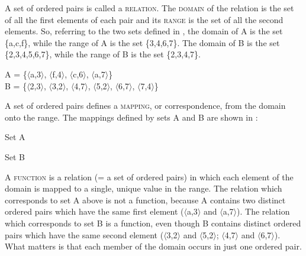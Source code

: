 A set of ordered pairs is called a \textsc{relation}. The \textsc{domain} of the relation is the set of all the first elements of each pair and its \textsc{range} is the set of all the second elements. So, referring to the two sets defined in , the domain of A is the set \{a,c,f\}, while the range of A is the set \{3,4,6,7\}. The domain of B is the set \{2,3,4,5,6,7\}, while the range of B is the set \{2,3,4,7\}. 


\ea
A = \{$\langle$a,3$\rangle$, $\langle$f,4$\rangle$, $\langle$c,6$\rangle$, $\langle$a,7$\rangle$\}\\
B = \{$\langle$2,3$\rangle$, $\langle$3,2$\rangle$, $\langle$4,7$\rangle$, $\langle$5,2$\rangle$, $\langle$6,7$\rangle$, $\langle$7,4$\rangle$\}
\z


A set of ordered pairs defines a \textsc{mapping}, or correspondence, from the domain onto the range. The mappings defined by sets A and B are shown in :

\ea
\ea  Set A\\
\ex  Set B\\

\z \z


A \textsc{function} is a relation (= a set of ordered pairs) in which each element of the domain is mapped to a single, unique value in the range. The relation which corresponds to set A above is not a function, because A contains two distinct ordered pairs which have the same first element ($\langle$a,3$\rangle$ and $\langle$a,7$\rangle$). The relation which corresponds to set B is a function, even though B contains distinct ordered pairs which have the same second element ($\langle$3,2$\rangle$ and $\langle$5,2$\rangle$; $\langle$4,7$\rangle$ and $\langle$6,7$\rangle$). What matters is that each member of the domain occurs in just one ordered pair.



